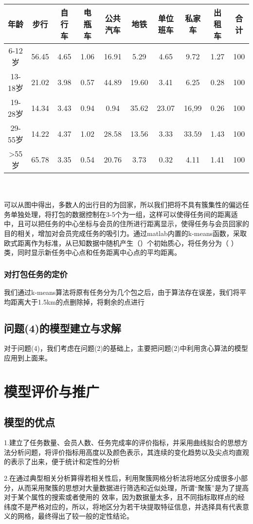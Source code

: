 \documentclass{ctexart}
\begin{document}
\begin{tabular}{|cccccccccc|}

\hline
年龄 &步行&自行车&电瓶车&公共汽车&地铁&单位班车&私家车&出租车&合计\\
\hline
6-12岁 &56.45&4.65&1.06&16.91&5.29&4.65&9.72&1.27&100\\
\hline
13-18岁 &21.02&3.98&0.57&44.89&19.60&3.41&6.25&0.28&100\\
\hline
19-28岁 &14.34&3.43&0.94&0.94&35.62&23.07&16,99&0.26&100\\
\hline
29-55岁 &14.22&4.37&1.02&28.58&13.56&3.33&33.59&1.43&100\\
\hline
>55岁 &65.78&3.35&0.54&20.76&3.73&0.32&4.11&1.41&100\\
\hline
\end{tabular}
\\
\\
可以从图中得出，多数人的出行目的为回家，所以我们把将不具有簇集性的偏远任务单独处理，将打包的数据控制在3-5个为一组，这样可以使得任务间的距离适中，且可以把任务的中心坐标与会员的住所进行距离显示，使得任务与会员回家的目的相关，增加对会员完成任务的吸引力。通过matlab内置的k-means函数，采取欧式距离作为标准，从已知数据中随机产生（）个初始质心，将任务分为（ ）类，同时显示新任务中心点和任务距离中心点的平均距离。
\subsubsection{对打包任务的定价}
我们通过k-means算法将原有任务分为几个包之后，由于算法存在误差，我们将平均距离大于1.5km的点删除掉，将剩余的点进行
\subsection{问题(4)的模型建立与求解}
对于问题(4)，我们考虑在问题(2)的基础上，主要把问题(2)中利用贪心算法的模型应用到上面来。


\section{模型评价与推广}
\subsection{模型的优点}
1.建立了任务数量、会员人数、任务完成率的评价指标，并采用曲线拟合的思想方法分析问题，将评价指标用高度以及颜色表示，其连续的变化趋势以及尖点均直观的表示了出来，便于统计和定性的分析

2.在通过典型相关分析算得若相关性后，利用聚簇网格分析法将地区分成很多小部分，从而采用聚簇的思想对大量数据进行筛选和近似处理，所谓“聚簇”是为了提高对于某个属性的搜索或者使用的 效率，因为数据量太多，且不同指标取样点的经纬度不是严格对应的，所以，将地区分为若干块提取特征信息，并选择具有代表意义的网格，最终得出了较一般的定性结论。
\end{document}
